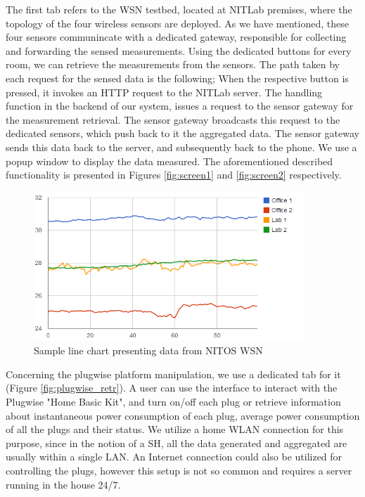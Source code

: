 \documentclass[conference]{IEEEtran}
\begin{document}
The first tab refers to the WSN testbed, located at NITLab premises, where the topology of the four wireless sensors are deployed.
As we have mentioned, these four sensors communincate with a dedicated gateway, responsible for collecting and forwarding the sensed measurements.
Using the dedicated buttons for every room, we can retrieve the measurements from the sensors.
The path taken by each request for the sensed data is the following;
When the respective button is pressed, it invokes an HTTP request to the NITLab server. 
The handling function in the backend of our system, issues a request to the sensor gateway for the measurement retrieval.
The sensor gateway broadcasts this request to the dedicated sensors, which push back to it the aggregated data.
The sensor gateway sends this data back to the server, and subsequently back to the phone.
We use a popup window to display the data measured.
The aforementioned described functionality is presented in Figures \ref{fig:screen1} and \ref{fig:screen2} respectively.


\begin{figure}[!t]
\begin{center}
\centering
\includegraphics[width=4in]{images/measurements_graph.png}
\caption{Sample line chart presenting data from NITOS WSN}
\label{fig:linechart}
\end{center}
\vspace{-0.8cm}
\end{figure}



Concerning the plugwise platform manipulation, we use a dedicated tab for it (Figure \ref{fig:plugwise_retr}).
A user can use the interface to interact with the Plugwise "Home Basic Kit", and turn on/off each plug or retrieve information about instantaneous power consumption of each plug, average power consumption of all the plugs and their status.
We utilize a home WLAN connection for this purpose, since in the notion of a SH, all the data generated and aggregated are usually within a single LAN.
An Internet connection could also be utilized for controlling the plugs, however this setup is not so common and requires a server running in the house 24/7.
\end{document}

